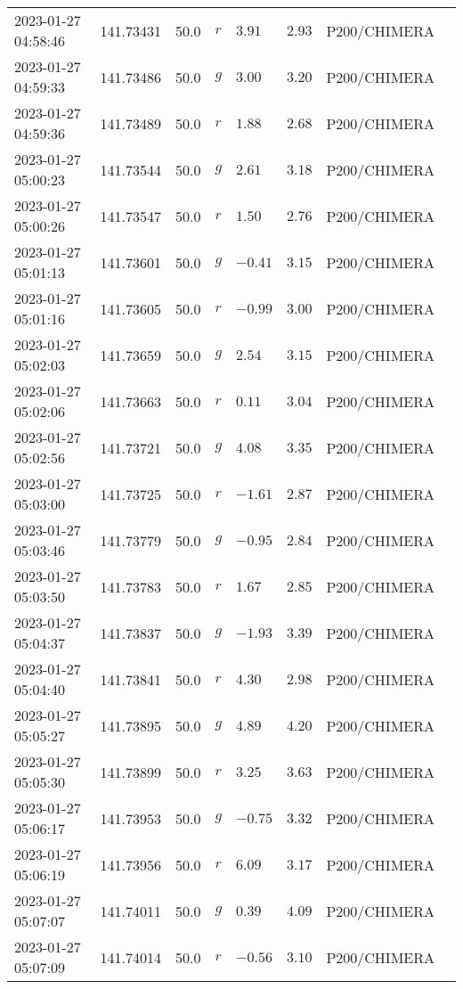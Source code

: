 \documentclass{nature_plusfigure}
\begin{document}
\begin{supplement}
\begin{center}
\begin{longtable}{llllllll}
2023-01-27 04:58:46 & 141.73431 & 50.0 & $r$ & $3.91$ & $2.93$ & P200/CHIMERA &  \\ 
2023-01-27 04:59:33 & 141.73486 & 50.0 & $g$ & $3.00$ & $3.20$ & P200/CHIMERA &  \\ 
2023-01-27 04:59:36 & 141.73489 & 50.0 & $r$ & $1.88$ & $2.68$ & P200/CHIMERA &  \\ 
2023-01-27 05:00:23 & 141.73544 & 50.0 & $g$ & $2.61$ & $3.18$ & P200/CHIMERA &  \\ 
2023-01-27 05:00:26 & 141.73547 & 50.0 & $r$ & $1.50$ & $2.76$ & P200/CHIMERA &  \\ 
2023-01-27 05:01:13 & 141.73601 & 50.0 & $g$ & $-0.41$ & $3.15$ & P200/CHIMERA &  \\ 
2023-01-27 05:01:16 & 141.73605 & 50.0 & $r$ & $-0.99$ & $3.00$ & P200/CHIMERA &  \\ 
2023-01-27 05:02:03 & 141.73659 & 50.0 & $g$ & $2.54$ & $3.15$ & P200/CHIMERA &  \\ 
2023-01-27 05:02:06 & 141.73663 & 50.0 & $r$ & $0.11$ & $3.04$ & P200/CHIMERA &  \\ 
2023-01-27 05:02:56 & 141.73721 & 50.0 & $g$ & $4.08$ & $3.35$ & P200/CHIMERA &  \\ 
2023-01-27 05:03:00 & 141.73725 & 50.0 & $r$ & $-1.61$ & $2.87$ & P200/CHIMERA &  \\ 
2023-01-27 05:03:46 & 141.73779 & 50.0 & $g$ & $-0.95$ & $2.84$ & P200/CHIMERA &  \\ 
2023-01-27 05:03:50 & 141.73783 & 50.0 & $r$ & $1.67$ & $2.85$ & P200/CHIMERA &  \\ 
2023-01-27 05:04:37 & 141.73837 & 50.0 & $g$ & $-1.93$ & $3.39$ & P200/CHIMERA &  \\ 
2023-01-27 05:04:40 & 141.73841 & 50.0 & $r$ & $4.30$ & $2.98$ & P200/CHIMERA &  \\ 
2023-01-27 05:05:27 & 141.73895 & 50.0 & $g$ & $4.89$ & $4.20$ & P200/CHIMERA &  \\ 
2023-01-27 05:05:30 & 141.73899 & 50.0 & $r$ & $3.25$ & $3.63$ & P200/CHIMERA &  \\ 
2023-01-27 05:06:17 & 141.73953 & 50.0 & $g$ & $-0.75$ & $3.32$ & P200/CHIMERA &  \\ 
2023-01-27 05:06:19 & 141.73956 & 50.0 & $r$ & $6.09$ & $3.17$ & P200/CHIMERA &  \\ 
2023-01-27 05:07:07 & 141.74011 & 50.0 & $g$ & $0.39$ & $4.09$ & P200/CHIMERA &  \\ 
2023-01-27 05:07:09 & 141.74014 & 50.0 & $r$ & $-0.56$ & $3.10$ & P200/CHIMERA &  \\ 

\end{longtable}
\end{center}
\end{supplement}
\end{document}
